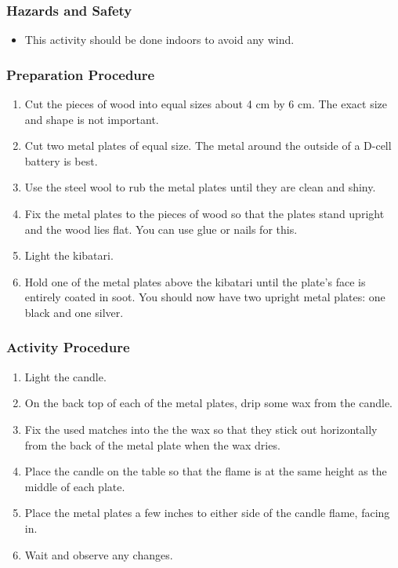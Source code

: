 \subsubsection*{Hazards and Safety}
\begin{itemize}
\item{This activity should be done indoors to avoid any wind.}
\end{itemize}

\subsubsection*{Preparation Procedure}
\begin{enumerate}
\item{Cut the pieces of wood into equal sizes about 4 cm by 6 cm.  The exact size and shape is not important.}
\item{Cut two metal plates of equal size.  The metal around the outside of a D-cell battery is best.}
\item{Use the steel wool to rub the metal plates until they are clean and shiny.}
\item{Fix the metal plates to the pieces of wood so that the plates stand upright and the wood lies flat.  You can use glue or nails for this.}
\item{Light the kibatari.}
\item{Hold one of the metal plates above the kibatari until the plate's face is entirely coated in soot.  You should now have two upright metal plates: one black and one silver.}
\end{enumerate}

\subsubsection*{Activity Procedure}
\begin{enumerate}
\item{Light the candle.}
\item{On the back top of each of the metal plates, drip some wax from the candle.}
\item{Fix the used matches into the the wax so that they stick out horizontally from the back of the metal plate when the wax dries.}
\item{Place the candle on the table so that the flame is at the same height as the middle of each plate.}
\item{Place the metal plates a few inches to either side of the candle flame, facing in.}
\item{Wait and observe any changes.}
\end{enumerate}


